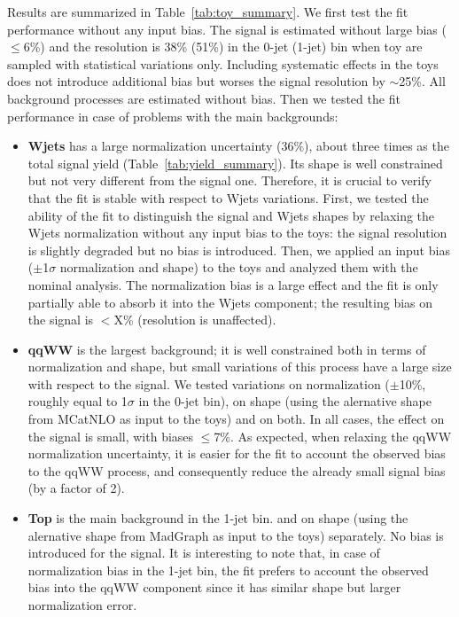Results are summarized in Table~\ref{tab:toy_summary}.
We first test the fit performance without any input bias. 
The signal is estimated without large bias ($\leq 6$\%) and the resolution is 38\% (51\%) in the 0-jet (1-jet) bin 
when toy are sampled with statistical variations only. Including systematic effects in the toys does not introduce
additional bias but worses the signal resolution by $\sim$25\%. All background processes are estimated without bias.
Then we tested the fit performance in case of problems with the main backgrounds:
\begin{itemize}
\item {\bf Wjets} has a large normalization uncertainty (36\%), about three times as the total signal yield (Table~\ref{tab:yield_summary}). 
Its shape is well constrained but not very different from the signal one. 
Therefore, it is crucial to verify that the fit is stable with respect to Wjets variations.
First, we tested the ability of the fit to distinguish the signal and Wjets shapes by relaxing the Wjets normalization without any input bias to the toys: the signal resolution is slightly degraded but no bias is introduced. 
Then, we applied an input bias ($\pm$1$\sigma$ normalization and shape) to the toys and analyzed them with the nominal analysis. 
The normalization bias is a large effect and the fit is only partially able to absorb it into the Wjets component; 
the resulting bias on the signal is $<$X\% (resolution is unaffected).
\item {\bf qqWW} is the largest background; it is well constrained both in terms of normalization and shape, but small variations of this 
process have a large size with respect to the signal. 
We tested variations on normalization ($\pm$10\%, roughly equal to 1$\sigma$ in the 0-jet bin), 
on shape (using the alernative shape from MCatNLO as input to the toys) and on both. 
In all cases, the effect on the signal is small, with biases $\leq$7\%. 
As expected, when relaxing the qqWW normalization uncertainty, it is easier for the fit to account the observed bias to the qqWW process,
and consequently reduce the already small signal bias (by a factor of 2).
\item {\bf Top} is the main background in the 1-jet bin. 
and on shape 
(using the alernative shape from MadGraph as input to the toys) separately. No bias is introduced for the signal. 
It is interesting to note that, in case of normalization bias in the 1-jet bin, the fit prefers to account the observed bias 
into the qqWW component since it has similar shape but larger normalization error.
\end{itemize}

